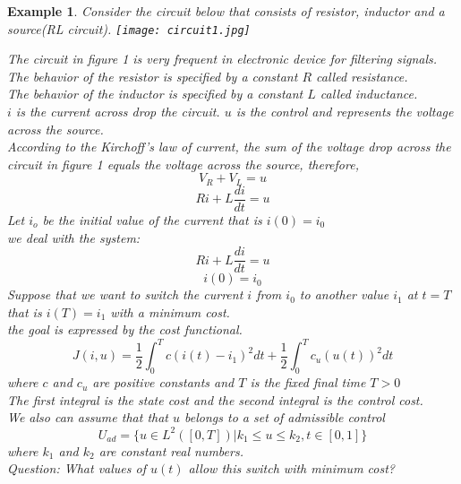 \documentclass[12pt]{article}
\newtheorem{example}{Example}
\begin{document}
\begin{example}
    Consider the circuit below that consists of resistor, inductor and a source(RL circuit). 
    \texttt{[image: circuit1.jpg]}

    The  circuit  in figure 1 is very frequent in electronic device for filtering signals.\\
    The behavior of the resistor is specified by  a constant $R$ called resistance.\\
    The behavior of the inductor is specified by a constant $L$ called inductance.\\
    $i$ is the current across drop the circuit.
    $u$ is the control and represents the voltage across  the source.\\
    According to the Kirchoff's law of current,
    the sum of the voltage drop across the circuit  in figure 1 equals the voltage across 
    the source, therefore,
    $$V_R+V_L=u$$
    $$Ri+L\frac{di}{dt}=u$$
    Let $i_o$ be the initial value of the current that is $i(0)=i_0$\\
    we deal with the system:
    $$Ri+L\frac{di}{dt}=u$$
    $$i(0)=i_0$$
    Suppose that we want to switch the current $i$ from $i_0$ to another value $i_1$ at $t=T$ that is $i(T)=i_1$ with a minimum cost.\\
    the goal is expressed by the cost functional.
    $$J(i,u)=\frac{1}{2}\int_{0}^{T} c(i(t)-i_1)^2dt+\frac{1}{2}\int_{0}^{T}c_{u}(u(t))^2dt$$
 where $c$ and $c_u$ are positive constants and $T$ is the fixed final time $T>0$\\    
 The first integral is the state cost and the second integral is the control cost.\\
 We also can assume that that $u$ belongs to a set of admissible control
 $$U_{ad}=\{u\in L^2([0,T]) |  k_1\leq u\leq k_2 , t\in [0, 1]\} $$
 where $k_1$ and $k_2$ are constant real numbers.\\
 Question: What values of $u(t)$ allow this switch with minimum cost?
\end{example}
\end{document}
